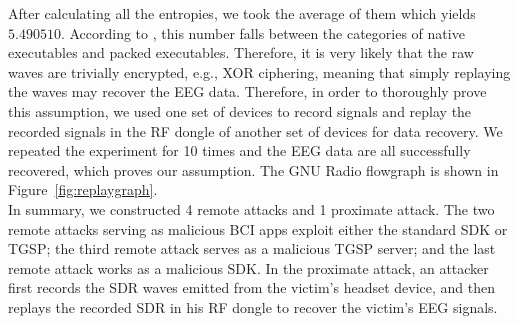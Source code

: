 %
\indent After calculating all the entropies, we took the average of them which yields $5.490510$. According to \cite{lyda2007using}, this number falls between the categories of native executables and packed executables. Therefore, it is very likely that the raw waves are trivially encrypted, e.g., XOR ciphering, meaning that simply replaying the waves may recover the EEG data. Therefore, in order to thoroughly prove this assumption, we used one set of devices to record signals and replay the recorded signals in the RF dongle of another set of devices for data recovery. We repeated the experiment for 10 times and the EEG data are all successfully recovered, which proves our assumption. The GNU Radio flowgraph is shown in Figure~\ref{fig:replaygraph}.\\
%
\indent In summary, we constructed 4 remote attacks and 1 proximate attack. The two remote attacks serving as malicious BCI apps exploit either the standard SDK or TGSP; the third remote attack serves as a malicious TGSP server; and the last remote attack works as a malicious SDK. In the proximate attack, an attacker first records the SDR waves emitted from the victim's headset device, and then replays the recorded SDR in his RF dongle to recover the victim's EEG signals.
